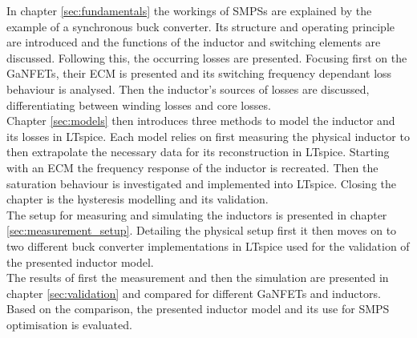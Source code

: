 In chapter \ref{sec:fundamentals} the workings of \acp{SMPS} are explained by the example of a synchronous buck converter. Its structure and operating principle are introduced and the functions of the inductor and switching elements are discussed. Following this, the occurring losses are presented. Focusing first on the \acp{GaNFET}, their \ac{ECM} is presented and its switching frequency dependant loss behaviour is analysed. Then the inductor's sources of losses are discussed, differentiating between winding losses and core losses.\\

Chapter \ref{sec:models} then introduces three methods to model the inductor and its losses in LTspice. Each model relies on first measuring the physical inductor to then extrapolate the necessary data for its reconstruction in LTspice. Starting with an \ac{ECM} the frequency response of the inductor is recreated. Then the saturation behaviour is investigated and implemented into LTspice. Closing the chapter is the hysteresis modelling and its validation.\\

The setup for measuring and simulating the inductors is presented in chapter \ref{sec:measurement_setup}. Detailing the physical setup first it then moves on to two different buck converter implementations in LTspice used for the validation of the presented inductor model.\\

The results of first the measurement and then the simulation are presented in chapter \ref{sec:validation} and compared for different \acp{GaNFET} and inductors. Based on the comparison, the presented inductor model and its use for \ac{SMPS} optimisation is evaluated.\\
